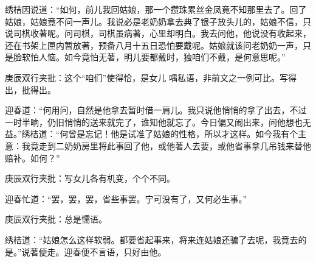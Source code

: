 \begin{parag}


    绣桔因说道：“如何，前儿我回姑娘，那一个攒珠累丝金凤竟不知那里去了。回了姑娘，姑娘竟不问一声儿。我说必是老奶奶拿去典了银子放头儿的，姑娘不信，只说司棋收著呢。问司棋，司棋虽病著，心里却明白。我去问他，他说没有收起来，还在书架上匣内暂放著，预备八月十五日恐怕要戴呢。姑娘就该问老奶奶一声，只是脸软怕人恼。如今竟怕无著，明儿要都戴时，独咱们不戴，是何意思呢。”\begin{note}庚辰双行夹批：这个“咱们”使得恰，是女儿 喁私语，非前文之一例可比。写得出，批得出。\end{note}迎春道：“何用问，自然是他拿去暂时借一肩儿。我只说他悄悄的拿了出去，不过一时半晌，仍旧悄悄的送来就完了，谁知他就忘了。今日偏又闹出来，问他想也无益。”绣桔道：“何曾是忘记！他是试准了姑娘的性格，所以才这样。如今我有个主意：我竟走到二奶奶房里将此事回了他，或他著人去要，或他省事拿几吊钱来替他赔补。如何？”\begin{note}庚辰双行夹批：写女儿各有机变，个个不同。\end{note}迎春忙道：“罢，罢，罢，省些事罢。宁可没有了，又何必生事。”\begin{note}庚辰双行夹批：总是懦语。\end{note}绣桔道：“姑娘怎么这样软弱。都要省起事来，将来连姑娘还骗了去呢，我竟去的是。”说著便走。迎春便不言语，只好由他。
\end{parag}


